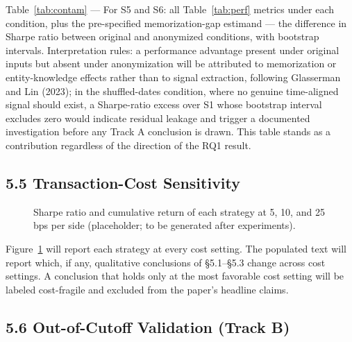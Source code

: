 \documentclass[
  12pt,
]{article}
\begin{document}
\begin{table}[H]
\centering
{}
\caption{LLM-based strategies under the three contamination conditions of §3.4, with the memorization-gap estimand (placeholder; to be populated after experiments).}
\label{tab:contam}
\end{table}

Table~\ref{tab:contam} — For S5 and S6: all
Table~\ref{tab:perf} metrics under each condition, plus the pre-specified
memorization-gap estimand --- the difference in Sharpe ratio between
original and anonymized conditions, with bootstrap intervals.
Interpretation rules: a performance advantage present under original
inputs but absent under anonymization will be attributed to memorization
or entity-knowledge effects rather than to signal extraction, following
Glasserman and Lin (2023); in the shuffled-dates condition, where no
genuine time-aligned signal should exist, a Sharpe-ratio excess over S1
whose bootstrap interval excludes zero would indicate residual leakage
and trigger a documented investigation before any Track A conclusion is
drawn. This table stands as a contribution regardless of the direction
of the RQ1 result.

\hypertarget{transaction-cost-sensitivity}{%
\subsection{5.5 Transaction-Cost
Sensitivity}\label{transaction-cost-sensitivity}}



\begin{figure}[H]
\centering
{}
\caption{Sharpe ratio and cumulative return of each strategy at 5, 10, and 25 bps per side (placeholder; to be generated after experiments).}
\label{fig:cost}
\end{figure}

Figure~\ref{fig:cost} will report each strategy at every cost setting. The
populated text will report which, if any, qualitative conclusions of
§5.1--§5.3 change across cost settings. A conclusion that holds only at
the most favorable cost setting will be labeled cost-fragile and
excluded from the paper's headline claims.

\hypertarget{out-of-cutoff-validation-track-b}{%
\subsection{5.6 Out-of-Cutoff Validation (Track
B)}\label{out-of-cutoff-validation-track-b}}
\end{document}
